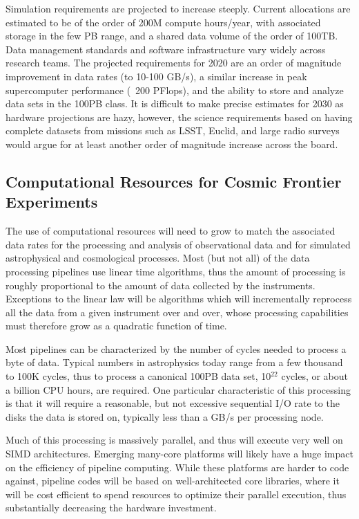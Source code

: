 Simulation requirements are projected to increase steeply. Current
allocations are estimated to be of the order of 200M compute
hours/year, with associated storage in the few PB range, and a shared
data volume of the order of 100TB. Data management standards and
software infrastructure vary widely across research teams. The
projected requirements for 2020 are an order of magnitude improvement
in data rates (to 10-100 GB/s), a similar increase in peak
supercomputer performance (~200 PFlops), and the ability to store and
analyze data sets in the 100PB class. It is difficult to make precise
estimates for 2030 as hardware projections are hazy, however, the
science requirements based on having complete datasets from missions
such as LSST, Euclid, and large radio surveys would argue for at least
another order of magnitude increase across the board.

\subsection{Computational Resources for Cosmic Frontier Experiments}  

The use of computational resources will need to grow to match the
associated data rates for the processing and analysis of observational
data and for simulated astrophysical and cosmological processes. Most
(but not all) of the data processing pipelines use linear time
algorithms, thus the amount of processing is roughly proportional to
the amount of data collected by the instruments. Exceptions to the
linear law will be algorithms which will incrementally reprocess all
the data from a given instrument over and over, whose processing
capabilities must therefore grow as a quadratic function of time.

Most pipelines can be characterized by the number of cycles needed to
process a byte of data. Typical numbers in astrophysics today range
from a few thousand to 100K cycles, thus to process a canonical 100PB
data set, 10$^{22}$ cycles, or about a billion CPU hours, are
required. One particular characteristic of this processing is that it
will require a reasonable, but not excessive sequential I/O rate to
the disks the data is stored on, typically less than a GB/s per
processing node.

Much of this processing is massively parallel, and thus will execute
very well on SIMD architectures. Emerging many-core platforms will
likely have a huge impact on the efficiency of pipeline
computing. While these platforms are harder to code against, pipeline
codes will be based on well-architected core libraries, where it will
be cost efficient to spend resources to optimize their parallel
execution, thus substantially decreasing the hardware investment.

